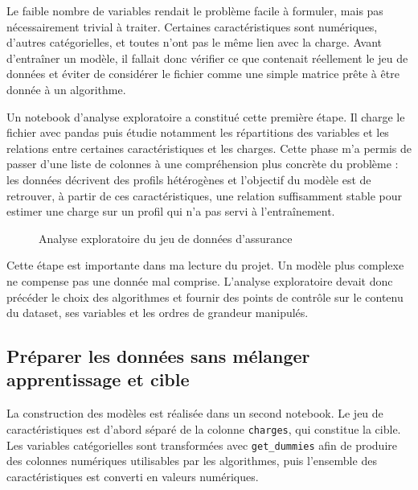 Le faible nombre de variables rendait le problème facile à formuler, mais pas nécessairement trivial à traiter. Certaines caractéristiques sont numériques, d'autres catégorielles, et toutes n'ont pas le même lien avec la charge. Avant d'entraîner un modèle, il fallait donc vérifier ce que contenait réellement le jeu de données et éviter de considérer le fichier comme une simple matrice prête à être donnée à un algorithme.

Un notebook d'analyse exploratoire a constitué cette première étape. Il charge le fichier avec pandas puis étudie notamment les répartitions des variables et les relations entre certaines caractéristiques et les charges. Cette phase m'a permis de passer d'une liste de colonnes à une compréhension plus concrète du problème : les données décrivent des profils hétérogènes et l'objectif du modèle est de retrouver, à partir de ces caractéristiques, une relation suffisamment stable pour estimer une charge sur un profil qui n'a pas servi à l'entraînement.

\begin{figure}[H]
\centering
{}
\caption{Analyse exploratoire du jeu de données d'assurance}
\label{fig:insurance-exploration}
\end{figure}

Cette étape est importante dans ma lecture du projet. Un modèle plus complexe ne compense pas une donnée mal comprise. L'analyse exploratoire devait donc précéder le choix des algorithmes et fournir des points de contrôle sur le contenu du dataset, ses variables et les ordres de grandeur manipulés.

\subsection{Préparer les données sans mélanger apprentissage et cible}

La construction des modèles est réalisée dans un second notebook. Le jeu de caractéristiques est d'abord séparé de la colonne \texttt{charges}, qui constitue la cible. Les variables catégorielles sont transformées avec \texttt{get\_dummies} afin de produire des colonnes numériques utilisables par les algorithmes, puis l'ensemble des caractéristiques est converti en valeurs numériques.

